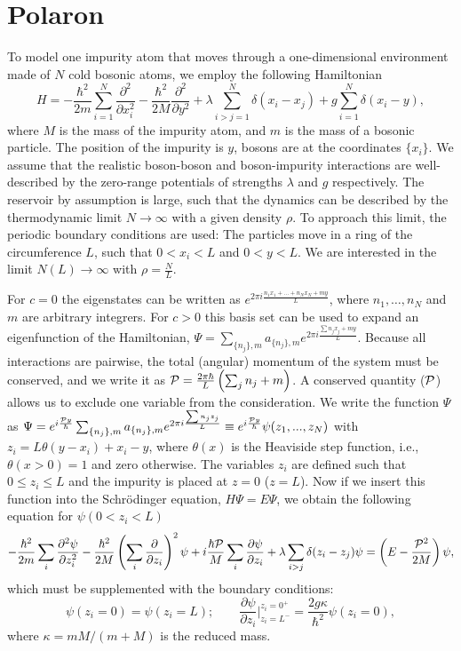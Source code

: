 \documentclass[twocolumn,amsmath,amssymb,showpacs,prl,superscriptaddress,aps]{revtex4-1}
\begin{document}
\section{Polaron}

To model one impurity atom that moves through a one-dimensional environment made of $N$ cold bosonic atoms, we employ the following Hamiltonian
\begin{equation}
H=-\frac{\hbar^2}{2m}\sum_{i=1}^N\frac{\partial^2}{\partial x_i^2}-\frac{\hbar^2}{2M}\frac{\partial^2}{\partial y^2}+\lambda \sum_{i>j=1}^N\delta(x_i-x_j)+g \sum_{i=1}^N \delta(x_i-y),
\end{equation}
where $M$ is the mass of the impurity atom, and $m$ is the mass of a bosonic particle. The position of the impurity is $y$, bosons are at the coordinates $\{x_i\}$. 
We assume that the realistic boson-boson and boson-impurity interactions are well-described by the zero-range potentials of strengths $\lambda$ and $g$ respectively. 
The reservoir by assumption is large, such that the dynamics can be described by the thermodynamic limit $N\to \infty$ with a given density $\rho$.
To approach this limit, the periodic boundary conditions are used: The particles move in a ring of the circumference $L$, such that $0<x_i<L$ and $0<y<L$.
We are interested in the limit $N(L)\to \infty$ with $\rho=\frac{N}{L}$.


For $c=0$ the eigenstates can be written as $e^{2\pi i \frac{n_1x_1+\ldots+n_N x_N+my}{L}}$, where $n_1,\ldots,n_N$ and $m$ are arbitrary integrers. 
For $c>0$ this basis set can be used to expand an eigenfunction of the Hamiltonian, $\Psi=\sum_{\{n_j\},m} a_{\{n_j\},m}e^{2\pi i \frac{\sum n_jx_j+my}{L}}$. 
Because all interactions are pairwise, 
the total (angular) momentum of the system must be conserved, and we write it as ${\cal P}=\frac{2\pi\hbar}{L}\left(\sum_{j} n_j+m\right)$.
A conserved quantity (${\cal P}$) allows us to exclude one variable from the consideration. 
We write the function $\Psi$ as $\Psi=e^{i \frac{{\cal P} y}{\hbar}}\sum_{\{n_j\},m} a_{\{n_j\},m}e^{2\pi i \frac{\sum n_jz_j}{L}}\equiv e^{i \frac{{\cal P} y}{\hbar}} \psi(z_1,...,z_N)$ 
with $z_i=L\theta(y-x_i)+x_i-y$, where $\theta(x)$ is the Heaviside step function, i.e., 
$\theta(x>0) = 1$ and zero otherwise. The variables $z_i$ are defined such that $0\leq z_i \leq L$ and the impurity is placed at $z=0$ ($z=L$). Now if we insert this 
function into the Schr{\"o}dinger equation, $H\Psi=E\Psi$, we obtain the following equation for $\psi(0<z_i<L)$
\begin{equation}
-\frac{\hbar^2}{2m}\sum_i\frac{\partial^2 \psi}{\partial z_i^2}-\frac{\hbar^2}{2M}\left(\sum_{i}\frac{\partial }{\partial z_i}\right)^2\psi
+ i \frac{\hbar {\cal P}}{M}\sum_{i}\frac{\partial \psi}{\partial z_i}+\lambda \sum_{i>j}\delta(z_i-z_j)\psi=\left(E-\frac{{\cal P}^2}{2M}\right)\psi,
\end{equation}
which must be supplemented with the boundary conditions:
\begin{equation}
\psi(z_i=0)=\psi(z_i=L); \qquad \frac{\partial \psi}{\partial z_i}\bigg|^{z_i=0^+}_{z_i=L^-}= \frac{2 g \kappa}{\hbar^2} \psi(z_i=0),
\end{equation}
where $\kappa=mM/(m+M)$ is the reduced mass.
\end{document}
